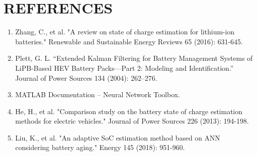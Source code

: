 \documentclass[12pt]{article}
\begin{document}
\section*{REFERENCES}
\begin{enumerate}
    \item Zhang, C., et al. "A review on state of charge estimation for lithium-ion batteries." Renewable and Sustainable Energy Reviews 65 (2016): 631-645.
    \item Plett, G. L. “Extended Kalman Filtering for Battery Management Systems of LiPB-Based HEV Battery Packs—Part 2: Modeling and Identification.” Journal of Power Sources 134 (2004): 262–276.
    \item MATLAB Documentation – Neural Network Toolbox.
    \item He, H., et al. "Comparison study on the battery state of charge estimation methods for electric vehicles." Journal of Power Sources 226 (2013): 194-198.
    \item Liu, K., et al. "An adaptive SoC estimation method based on ANN considering battery aging." Energy 145 (2018): 951-960.
\end{enumerate}
\end{document}
